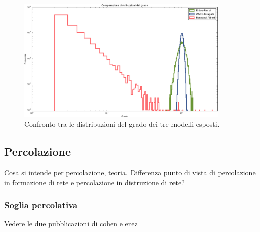 \begin{figure}[t!]
	\centering
	\includegraphics[width=0.9\textwidth]{./Immagini/Par1/compareSameN}
	\caption{Confronto tra le distribuzioni del grado dei tre modelli esposti.}
	\label{fig:barabalbero}
\end{figure}


\subsection{Percolazione} 
Cosa si intende per percolazione, teoria. Differenza punto di vista di percolazione in formazione di rete e percolazione in distruzione di rete?

\subsubsection{Soglia percolativa} 
Vedere le due pubblicazioni di cohen e erez


\clearpage